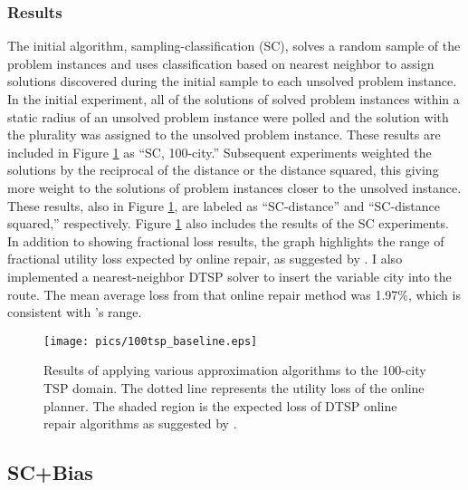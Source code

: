 \subsubsection{Results}  The initial algorithm, sampling-classification (SC), solves a random sample of the problem instances and uses classification based on nearest neighbor to assign solutions discovered during the initial sample to each unsolved problem instance.  In the initial experiment, all of the solutions of solved problem instances within a static radius of an unsolved problem instance  were polled and the solution with the plurality was assigned to the unsolved problem instance.  These results are included in Figure \ref{fig:100tsp_baseline} as ``SC, 100-city.''  Subsequent experiments weighted the solutions by the reciprocal of the distance or the distance squared, this giving more weight to the solutions of problem instances closer to  the unsolved instance.  These results, also in Figure \ref{fig:100tsp_baseline}, are labeled as ``SC-distance'' and ``SC-distance squared,'' respectively.  Figure \ref{fig:100tsp_baseline} also includes the  results of the SC experiments.  In addition to showing fractional loss results, the graph highlights the range of fractional utility loss expected by online repair, as suggested by \cite{larsen2000dvrp}.  I also implemented a nearest-neighbor DTSP solver to insert the variable city into the route.  The mean average loss from that online repair method was 1.97\%, which is consistent with \citeauthor{larsen2000dvrp}'s range.

\begin{figure}
\begin{center}
\texttt{[image: pics/100tsp\_baseline.eps]}
\caption{Results of applying various approximation algorithms to the 100-city TSP domain.  The dotted line represents the utility loss of the online planner.  The shaded region is the expected loss of DTSP online repair algorithms as suggested by \cite{larsen2000dvrp}.}
\label{fig:100tsp_baseline}
\end{center}
\end{figure}

\subsection{SC+Bias} 

